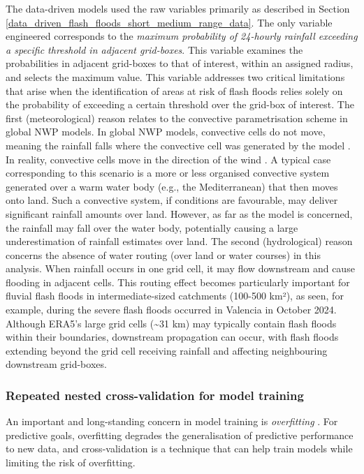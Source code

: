 The  data-driven models used the raw variables primarily as described in Section \ref{data_driven_flash_floods_short_medium_range_data}. The only variable engineered corresponds to the \textit{maximum probability of 24-hourly rainfall exceeding a specific threshold in adjacent grid-boxes}. This variable examines the probabilities in adjacent grid-boxes to that of interest, within an assigned radius, and selects the maximum value. This variable addresses two critical limitations that arise when the identification of areas at risk of flash floods relies solely on the probability of exceeding a certain threshold over the grid-box of interest. The first (meteorological) reason relates to the convective parametrisation scheme in global NWP models. In global NWP models, convective cells do not move, meaning the rainfall falls where the convective cell was generated by the model \citep{Doswell_2001}. In reality, convective cells move in the direction of the wind \citep{Doswell_2001}. A typical case corresponding to this scenario is a more or less organised convective system generated over a warm water body (e.g., the Mediterranean) that then moves onto land. Such a convective system, if conditions are favourable, may deliver significant rainfall amounts over land. However, as far as the model is concerned, the rainfall may fall over the water body, potentially causing a large underestimation of rainfall estimates over land. The second (hydrological) reason concerns the absence of water routing (over land or water courses) in this analysis. When rainfall occurs in one grid cell, it may flow downstream and cause flooding in adjacent cells. This routing effect becomes particularly important for fluvial flash floods in intermediate-sized catchments (100-500 km²), as seen, for example, during the severe flash floods occurred in Valencia in October 2024. Although ERA5's large grid cells (\sim31 km) may typically contain flash floods within their boundaries, downstream propagation can occur, with flash floods extending beyond the grid cell receiving rainfall and affecting neighbouring downstream grid-boxes.


\subsubsection{Repeated nested cross-validation for model training}

An important and long-standing concern in model training is \textit{overfitting} \citep{Ying_2019}. For predictive goals, overfitting degrades the generalisation of predictive performance to new data, and cross-validation is a technique that can help train models while limiting the risk of overfitting. 

